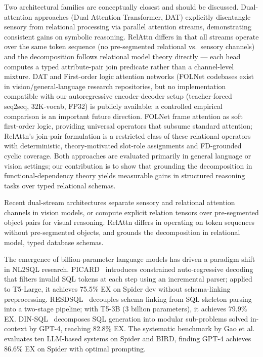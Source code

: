 \documentclass[conference]{IEEEtran}
\begin{document}
Two architectural families are conceptually closest and should be discussed. Dual-attention approaches (Dual Attention Transformer, DAT) \cite{ding2022davit} explicitly disentangle sensory from relational processing via parallel attention streams, demonstrating consistent gains on symbolic reasoning. RelAttn differs in that all streams operate over the same token sequence (no pre-segmented relational vs.\ sensory channels) and the decomposition follows relational  model theory directly --- each head computes a typed attribute-pair join predicate rather than a channel-level mixture. DAT and First-order logic attention networks (FOLNet \cite{chen2023learning} codebases exist in vision/general-language research repositories, but no implementation compatible with our autoregressive encoder-decoder setup (teacher-forced seq2seq, 32K-vocab, FP32) is publicly available; a controlled empirical comparison is an important future direction. FOLNet frame attention as soft first-order logic, providing universal operators that subsume standard attention; RelAttn's join-pair formulation is a restricted class of these relational operators with deterministic, theory-motivated slot-role assignments and FD-grounded cyclic coverage. Both approaches are evaluated primarily in general language or vision settings; our contribution is to show that grounding the decomposition in functional-dependency theory yields measurable gains in structured reasoning tasks over typed relational schemas.

Recent dual-stream architectures separate sensory and relational attention channels in vision models, or compute explicit relation tensors over pre-segmented object pairs for visual reasoning. RelAttn differs in operating on token sequences without pre-segmented objects, and grounds the decomposition in relational model, typed database schemas.


The emergence of billion-parameter language models has driven a paradigm shift in NL2SQL research. PICARD~\cite{scholak2021picard} introduces constrained auto-regressive decoding that filters invalid SQL tokens at each step using an incremental parser; applied to T5-Large, it achieves 75.5\% EX on Spider dev without schema-linking preprocessing. RESDSQL~\cite{li2023resdsql} decouples schema linking from SQL skeleton parsing into a two-stage pipeline; with T5-3B (3 billion parameters), it achieves 79.9\% EX. DIN-SQL~\cite{pourreza2023dinsql} decomposes SQL generation into modular sub-problems solved in-context by GPT-4, reaching 82.8\% EX. The systematic benchmark by Gao et al.~\cite{gao2024daisql} evaluates ten LLM-based systems on Spider and BIRD, finding GPT-4 achieves 86.6\% EX on Spider with optimal prompting.
\end{document}
